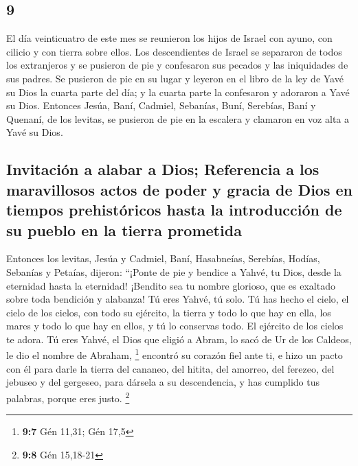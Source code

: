 \begin{paracol}{2}
\hypertarget{section-16}{%
\section{9}\label{section-16}}

 El día veinticuatro de este mes se reunieron los hijos de
Israel con ayuno, con cilicio y con tierra sobre ellos. 
Los descendientes de Israel se separaron de todos los extranjeros y se
pusieron de pie y confesaron sus pecados y las iniquidades de sus
padres.  Se pusieron de pie en su lugar y leyeron en el
libro de la ley de Yavé su Dios la cuarta parte del día; y la cuarta
parte la confesaron y adoraron a Yavé su Dios.  Entonces
Jesúa, Baní, Cadmiel, Sebanías, Buní, Serebías, Baní y Quenaní, de los
levitas, se pusieron de pie en la escalera y clamaron en voz alta a Yavé
su Dios.

\hypertarget{invitaciuxf3n-a-alabar-a-dios-referencia-a-los-maravillosos-actos-de-poder-y-gracia-de-dios-en-tiempos-prehistuxf3ricos-hasta-la-introducciuxf3n-de-su-pueblo-en-la-tierra-prometida}{%
\subsection{Invitación a alabar a Dios; Referencia a los maravillosos
actos de poder y gracia de Dios en tiempos prehistóricos hasta la
introducción de su pueblo en la tierra
prometida}\label{invitaciuxf3n-a-alabar-a-dios-referencia-a-los-maravillosos-actos-de-poder-y-gracia-de-dios-en-tiempos-prehistuxf3ricos-hasta-la-introducciuxf3n-de-su-pueblo-en-la-tierra-prometida}}

 Entonces los levitas, Jesúa y Cadmiel, Baní, Hasabneías,
Serebías, Hodías, Sebanías y Petaías, dijeron: ``¡Ponte de pie y bendice
a Yahvé, tu Dios, desde la eternidad hasta la eternidad! ¡Bendito sea tu
nombre glorioso, que es exaltado sobre toda bendición y alabanza!
 Tú eres Yahvé, tú solo. Tú has hecho el cielo, el cielo
de los cielos, con todo su ejército, la tierra y todo lo que hay en
ella, los mares y todo lo que hay en ellos, y tú lo conservas todo. El
ejército de los cielos te adora.  Tú eres Yahvé, el Dios
que eligió a Abram, lo sacó de Ur de los Caldeos, le dio el nombre de
Abraham, \footnote{\textbf{9:7} Gén 11,31; Gén 17,5} 
encontró su corazón fiel ante ti, e hizo un pacto con él para darle la
tierra del cananeo, del hitita, del amorreo, del ferezeo, del jebuseo y
del gergeseo, para dársela a su descendencia, y has cumplido tus
palabras, porque eres justo. \footnote{\textbf{9:8} Gén 15,18-21}


\end{paracol}
